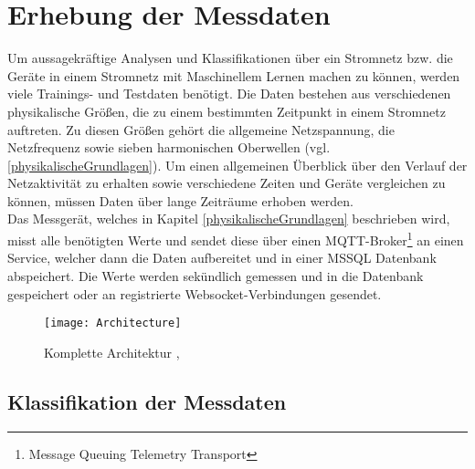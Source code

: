 
\section{Erhebung der Messdaten} \label{Messdaten}

    Um aussagekräftige Analysen und Klassifikationen über ein Stromnetz bzw. die Geräte in einem Stromnetz mit Maschinellem Lernen machen zu können, werden viele Trainings- und Testdaten benötigt.
    Die Daten bestehen aus verschiedenen physikalische Größen, die zu einem bestimmten Zeitpunkt in einem Stromnetz auftreten.
    Zu diesen Größen gehört die allgemeine Netzspannung, die Netzfrequenz sowie sieben harmonischen Oberwellen (vgl. \ref{physikalischeGrundlagen}).
    Um einen allgemeinen Überblick über den Verlauf der Netzaktivität zu erhalten sowie verschiedene Zeiten und Geräte vergleichen zu können, müssen Daten über lange Zeiträume erhoben werden.\\
    \newline
    Das Messgerät, welches in Kapitel \ref{physikalischeGrundlagen} beschrieben wird, misst alle benötigten Werte und sendet diese über einen MQTT-Broker\footnote{Message Queuing Telemetry Transport} an einen Service, welcher dann die Daten aufbereitet und in einer MSSQL Datenbank abspeichert.
    Die Werte werden sekündlich gemessen und in die Datenbank gespeichert oder an registrierte Websocket-Verbindungen gesendet.
    \newline

    \begin{figure}[h]
        \centering
        \texttt{[image: Architecture]}
        \caption{Komplette Architektur \protect\cite{DrawIO}, \protect\cite{Tensorflow}}
        \label{fig:Architecture}
    \end{figure}

    \subsection{Klassifikation der Messdaten}\label{KlassifikationDerMessdaten}

